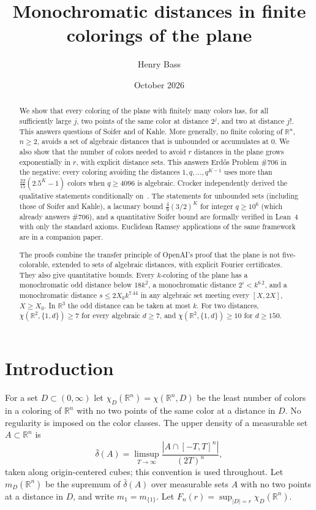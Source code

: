 \documentclass[11pt]{amsart}
\title[Monochromatic distances in finite colorings of the plane]{Monochromatic distances in finite colorings of the plane}
\author{Henry Bass}
\date{October 2026}
\theoremstyle{definition}
\newcommand{\R}{\mathbb{R}}
\begin{document}
\begin{abstract}
We show that every coloring of the plane with finitely many colors has, for all sufficiently large $j$, two points of the same color at distance $2^j$, and two at distance $j!$. This answers questions of Soifer and of Kahle. More generally, no finite coloring of $\R^n$, $n\ge2$, avoids a set of algebraic distances that is unbounded or accumulates at $0$. We also show that the number of colors needed to avoid $r$ distances in the plane grows exponentially in $r$, with explicit distance sets. This answers Erd\H{o}s Problem \#706 in the negative: every coloring avoiding the distances $1,q,\dots,q^{K-1}$ uses more than $\frac{22}{15}(2.5^K-1)$ colors when $q\ge4096$ is algebraic. Crocker independently derived the qualitative statements conditionally on~\cite[Theorem 2.3]{OAI}. The statements for unbounded sets (including those of Soifer and Kahle), a lacunary bound $\frac49(3/2)^K$ for integer $q\ge10^6$ (which already answers \#706), and a quantitative Soifer bound are formally verified in Lean~4 with only the standard axioms. Euclidean Ramsey applications of the same framework are in a companion paper.

The proofs combine the transfer principle of OpenAI's proof that the plane is not five-colorable, extended to sets of algebraic distances, with explicit Fourier certificates. They also give quantitative bounds. Every $k$-coloring of the plane has a monochromatic odd distance below $18k^2$, a monochromatic distance $2^i<k^{6.2}$, and a monochromatic distance $s\le2X_0k^{7.44}$ in any algebraic set meeting every $[X,2X]$, $X\ge X_0$. In $\R^3$ the odd distance can be taken at most $k$. For two distances, $\chi(\R^2,\{1,d\})\ge7$ for every algebraic $d\ge7$, and $\chi(\R^2,\{1,d\})\ge10$ for $d\ge150$.
\end{abstract}
\maketitle

\section{Introduction}

For a set $D\subset(0,\infty)$ let $\chi_D(\R^n)=\chi(\R^n,D)$ be the least number of colors in a coloring of $\R^n$ with no two points of the same color at a distance in $D$. No regularity is imposed on the color classes. The upper density of a measurable set $A\subset\R^n$ is
\[
\bar\delta(A)=\limsup_{T\to\infty}\frac{|A\cap[-T,T]^n|}{(2T)^n},
\]
taken along origin-centered cubes; this convention is used throughout. Let $m_D(\R^n)$ be the supremum of $\bar\delta(A)$ over measurable sets $A$ with no two points at a distance in $D$, and write $m_1=m_{\{1\}}$. Let $F_n(r)=\sup_{|D|=r}\chi_D(\R^n)$.
\end{document}

